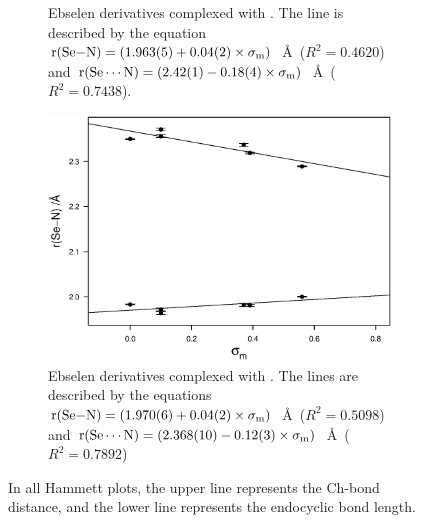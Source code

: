 \begin{refsection}
\begin{figure}
\begin{subfigure}[t]{0.45\linewidth}
\caption{Ebselen derivatives complexed with . The line is described by the equation $\mathrm{r}(\ce{Se-N}) = (1.963(5) + 0.04(2) \times \sigma_\text{m})$~\AA~($R^2=0.4620$) and $\mathrm{r}(\ce{Se\cdots N}) = (2.42(1) - 0.18(4) \times \sigma_\text{m})$~\AA~($R^2=0.7438$).}\label{fig:hammett-morph-meta}
\end{subfigure}
\hfill
\begin{subfigure}[t]{0.45\linewidth}
  \centering
\includegraphics[width=\linewidth]{Figures/hammett-pyrrol-m.eps}
\caption{Ebselen derivatives complexed with . The lines are described by the equations $\mathrm{r}(\ce{Se-N}) = (1.970(6) + 0.04(2) \times \sigma_\text{m})$~\AA~($R^2=0.5098$) and $\mathrm{r}(\ce{Se\cdots N}) = (2.368(10) - 0.12(3) \times \sigma_\text{m})$~\AA~($R^2=0.7892$)}\label{fig:hammett-pyrrol-meta}
\end{subfigure}
\caption[Hammett plots of endocyclic  bond length and  Ch-bond length of ebselen derivatives complexed with various Lewis bases ($\sigma_\text{m}$).]{In all Hammett plots, the upper line represents the  Ch-bond distance, and the lower line represents the endocyclic  bond length.}
\end{figure}


\end{refsection}
